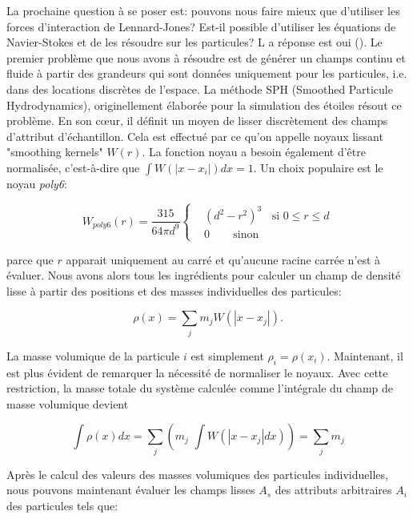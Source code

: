 \documentclass[11pt]{report}
\begin{document}
La prochaine question à se poser est: pouvons nous faire mieux que d'utiliser les forces d'interaction de Lennard-Jones? Est-il possible d'utiliser les équations de Navier-Stokes et de les résoudre sur les particules? L a réponse est oui (\cite{muller-charypar-2003}). Le premier problème que nous avons à résoudre est de générer un champs continu et fluide à partir des grandeurs qui sont données uniquement pour les particules, i.e. dans des locations discrètes de l'espace. La méthode SPH (Smoothed Particule Hydrodynamics), originellement élaborée pour la simulation des étoiles \cite{monaghan-1992} résout ce problème. En son c\oe ur, il définit un moyen de lisser discrètement des champs d'attribut d'échantillon. Cela est effectué par ce qu'on appelle noyaux lissant "smoothing kernels" $W(r)$. La fonction noyau a besoin également d'être normalisée, c'est-à-dire que $ \int{W(| x-x_i|)dx} = 1 $.
Un choix populaire est le noyau \textit{poly6}:

\begin{equation}
W_{poly6}(r) = \frac{315}{64 \pi d^9} \left\{
\begin{array}{rl}
&(d^2 - r^2)^3 \;\; \mbox{ si } 0 \leq r \leq  d\\
&0 \:\:\:\:\:\:\:\: \mbox{ sinon } 
\end{array}
\right.
\end{equation}

parce que $r$ apparait uniquement au carré et qu'aucune racine carrée n'est à évaluer. Nous avons alors tous les ingrédients pour calculer un champ de densité lisse à partir des positions et des masses individuelles des particules:

\begin{equation}\label{equation/yields-density}
\rho (x) = \sum_{\scriptstyle j} m_j W(|x - x_j|).
\end{equation}

La masse volumique de la particule $i$ est simplement $\rho_i = \rho (x_i)$. Maintenant, il est plus évident de remarquer la nécessité de normaliser le noyaux. Avec cette restriction, la masse totale du système calculée comme l'intégrale du champ de masse volumique devient

\begin{equation}
\int \rho (x)dx = \sum_j \left( 
m_j \,\, \int W(|x - x_j|dx )
\right) = \sum_j m_j
\end{equation}

Après le calcul des valeurs des masses volumiques des particules individuelles, nous pouvons maintenant évaluer les champs lisses $A_s$ des attributs arbitraires $A_i$ des particules tels que:
\end{document}
